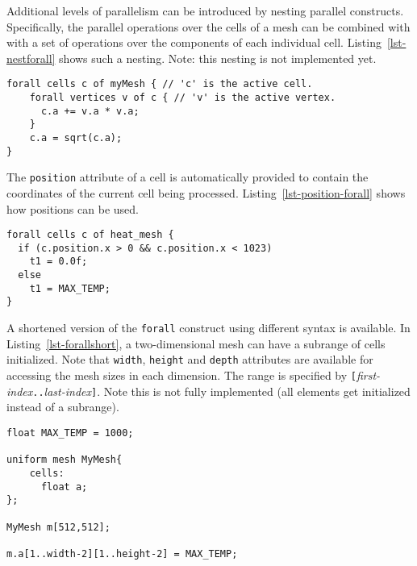 Additional levels of parallelism can be introduced by nesting parallel constructs.  
Specifically, the parallel operations over the cells of a mesh can be combined with  
with a set of operations over the components of each individual cell. Listing~\ref{lst-nestforall} 
shows such a nesting.  Note: this nesting is not implemented yet.

\par\bigskip
\begin{lstlisting}[float=h,label=lst-nestforall,
	caption={Nested \texttt{forall} loop construct over mesh components.}]
forall cells c of myMesh { // 'c' is the active cell.
	forall vertices v of c { // 'v' is the active vertex.
	  c.a += v.a * v.a;
	}
	c.a = sqrt(c.a);
}
\end{lstlisting}
\par\bigskip\noindent

The \texttt{position} attribute of a cell is automatically provided to contain the coordinates of the
current cell being processed. Listing~\ref{lst-position-forall} shows how positions can be
used.

\par\bigskip
\begin{lstlisting}[float=h,label=lst-position-forall,
	caption={Accessing the position of cells within \texttt{forall} loop construct.}]
forall cells c of heat_mesh {
  if (c.position.x > 0 && c.position.x < 1023)
    t1 = 0.0f;
  else
    t1 = MAX_TEMP;      
}
\end{lstlisting}
\par\bigskip\noindent

A shortened version of the \texttt{forall} construct using different syntax is
available.  In Listing~\ref{lst-forallshort}, a two-dimensional mesh can have
a subrange of cells initialized.  Note that \texttt{width}, \texttt{height} and
\texttt{depth} attributes are available for accessing the mesh sizes in each dimension.
The range is specified by \texttt{[}\textit{first-index}\texttt{..}\textit{last-index}\texttt{]}.
Note this is not fully implemented (all elements get initialized 
instead of a subrange).

\par\bigskip
\begin{lstlisting}[float=h,label=lst-forallshort,
	caption={\texttt{forall} short syntax for initialization.}]
float MAX_TEMP = 1000;

uniform mesh MyMesh{
    cells:
      float a;
};

MyMesh m[512,512];

m.a[1..width-2][1..height-2] = MAX_TEMP;
\end{lstlisting}
\par\bigskip\noindent


